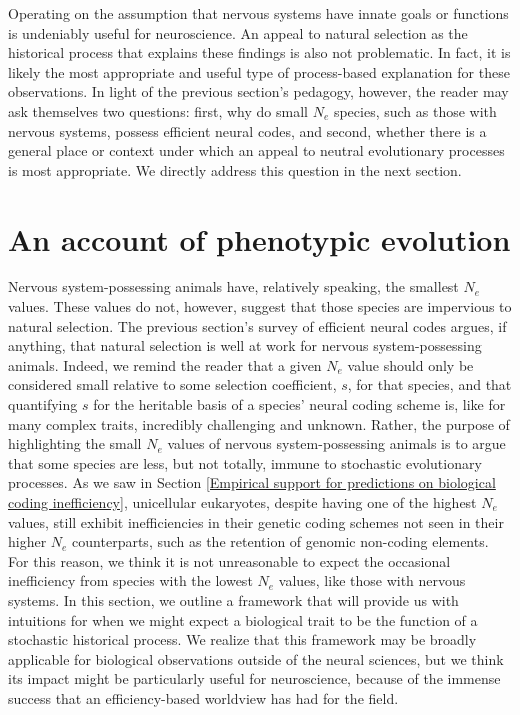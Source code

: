 \documentclass[twocolumn]{article}
\begin{document}
Operating on the assumption that nervous systems have innate goals or functions is undeniably useful for neuroscience. An appeal to natural selection as the historical process that explains these findings is also not problematic. In fact, it is likely the most appropriate and useful type of process-based explanation for these observations. In light of the previous section's pedagogy, however, the reader may ask themselves two questions: first, why do small $N_e$ species, such as those with nervous systems, possess efficient neural codes, and second, whether there is a general place or context under which an appeal to neutral evolutionary processes is most appropriate. We directly address this question in the next section.

\section{An account of phenotypic evolution}

Nervous system-possessing animals have, relatively speaking, the smallest $N_e$ values. These values do not, however, suggest that those species are impervious to natural selection. The previous section's survey of efficient neural codes argues, if anything, that natural selection is well at work for nervous system-possessing animals. Indeed, we remind the reader that a given $N_e$ value should only be considered small relative to some selection coefficient, $s$, for that species, and that quantifying $s$ for the heritable basis of a species' neural coding scheme is, like for many complex traits, incredibly challenging and unknown. Rather, the purpose of highlighting the small $N_e$ values of nervous system-possessing animals is to argue that some species are less, but not totally, immune to stochastic evolutionary processes. As we saw in Section \ref{Empirical support for predictions on biological coding inefficiency}, unicellular eukaryotes, despite having one of the highest $N_e$ values, still exhibit inefficiencies in their genetic coding schemes not seen in their higher $N_e$ counterparts, such as the retention of genomic non-coding elements. For this reason, we think it is not unreasonable to expect the occasional inefficiency from species with the lowest $N_e$ values, like those with nervous systems. In this section, we outline a framework that will provide us with intuitions for when we might expect a biological trait to be the function of a stochastic historical process. We realize that this framework may be broadly applicable for biological observations outside of the neural sciences, but we think its impact might be particularly useful for neuroscience, because of the immense success that an efficiency-based worldview has had for the field. 
\end{document}
